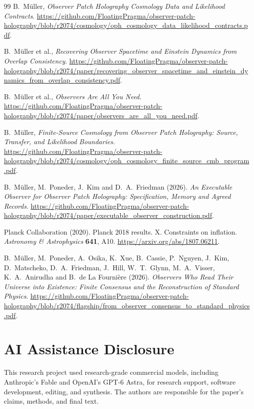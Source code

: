 \documentclass[11pt]{article}
\theoremstyle{remark}
\theoremstyle{plain}
\begin{document}
\begin{thebibliography}{99}
B.~M\"uller, \emph{Observer Patch Holography Cosmology Data and Likelihood Contracts}.
\url{https://github.com/FloatingPragma/observer-patch-holography/blob/r2074/cosmology/oph_cosmology_data_likelihood_contracts.pdf}.

B.~M\"uller et al.,
\emph{Recovering Observer Spacetime and Einstein Dynamics from Overlap Consistency}.
\url{https://github.com/FloatingPragma/observer-patch-holography/blob/r2074/paper/recovering_observer_spacetime_and_einstein_dynamics_from_overlap_consistency.pdf}.

B.~M\"uller et al., \emph{Observers Are All You Need}.
\url{https://github.com/FloatingPragma/observer-patch-holography/blob/r2074/paper/observers_are_all_you_need.pdf}.

B.~M\"uller, \emph{Finite-Source Cosmology from Observer Patch Holography:
Source, Transfer, and Likelihood Boundaries}.
\url{https://github.com/FloatingPragma/observer-patch-holography/blob/r2074/cosmology/oph_cosmology_finite_source_cmb_program.pdf}.

B.~M\"uller, M.~Poneder, J.~Kim and D.~A.~Friedman (2026). \emph{An Executable
Observer for Observer Patch Holography: Specification, Memory and Agreed
Records}.
\url{https://github.com/FloatingPragma/observer-patch-holography/blob/r2074/paper/executable_observer_construction.pdf}.

Planck Collaboration (2020). Planck 2018 results. X. Constraints on inflation.
\emph{Astronomy \& Astrophysics} \textbf{641}, A10.
\url{https://arxiv.org/abs/1807.06211}.

B.~M\"uller, M.~Poneder, A.~Osika, K.~Xue, B.~Cassie, P.~Nguyen, J.~Kim,
D.~Matscheko, D.~A.~Friedman, J.~Hill, W.~T.~Glynn, M.~A.~Visser,
K.~A.~Anirudha and B.~de La Fourni\`ere (2026). \emph{Observers Who Read Their
Universe into Existence: Finite Consensus and the Reconstruction of Standard
Physics}.
\url{https://github.com/FloatingPragma/observer-patch-holography/blob/r2074/flagship/from_observer_consensus_to_standard_physics.pdf}.

\end{thebibliography}

\section*{AI Assistance Disclosure}
This research project used research-grade commercial models, including
Anthropic's Fable and OpenAI's GPT-6 Astra, for research support, software
development, editing, and synthesis. The authors are responsible for the
paper's claims, methods, and final text.
\end{document}
